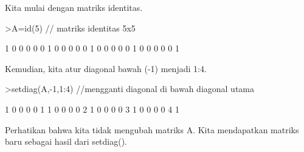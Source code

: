 \documentclass[a4paper,10pt]{article}
\begin{document}
\begin{eulernotebook}
\begin{eulercomment}
\begin{eulercomment}
\begin{eulercomment}
\begin{eulercomment}
\begin{eulercomment}
\begin{eulercomment}
\begin{eulercomment}
\begin{eulercomment}
\begin{eulercomment}
\begin{eulercomment}
\begin{eulercomment}
\begin{eulercomment}
\begin{eulercomment}
\begin{eulercomment}
\begin{eulercomment}
\begin{eulercomment}
\begin{eulercomment}
\begin{eulercomment}
\begin{eulercomment}
Kita mulai dengan matriks identitas.
\end{eulercomment}
\begin{eulerprompt}
>A=id(5) // matriks identitas 5x5
\end{eulerprompt}
\begin{euleroutput}
              1             0             0             0             0 
              0             1             0             0             0 
              0             0             1             0             0 
              0             0             0             1             0 
              0             0             0             0             1 
\end{euleroutput}
\begin{eulercomment}
Kemudian, kita atur diagonal bawah (-1) menjadi 1:4.
\end{eulercomment}
\begin{eulerprompt}
>setdiag(A,-1,1:4) //mengganti diagonal di bawah diagonal utama
\end{eulerprompt}
\begin{euleroutput}
              1             0             0             0             0 
              1             1             0             0             0 
              0             2             1             0             0 
              0             0             3             1             0 
              0             0             0             4             1 
\end{euleroutput}
\begin{eulercomment}
Perhatikan bahwa kita tidak mengubah matriks A. Kita mendapatkan
matriks baru sebagai hasil dari setdiag().


\end{eulercomment}
\end{eulercomment}
\end{eulercomment}
\end{eulercomment}
\end{eulercomment}
\end{eulercomment}
\end{eulercomment}
\end{eulercomment}
\end{eulercomment}
\end{eulercomment}
\end{eulercomment}
\end{eulercomment}
\end{eulercomment}
\end{eulercomment}
\end{eulercomment}
\end{eulercomment}
\end{eulercomment}
\end{eulercomment}
\end{eulercomment}
\end{eulernotebook}
\end{document}

